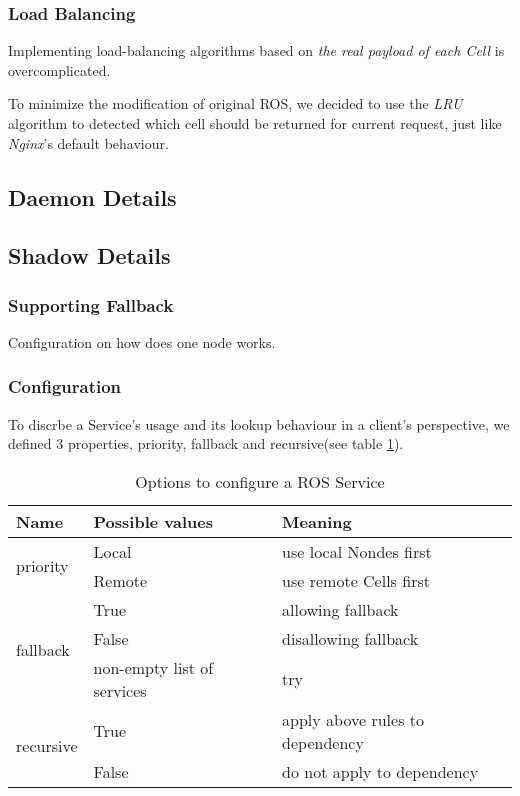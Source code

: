\subsubsection{Load Balancing}
Implementing load-balancing algorithms based on \emph{the real payload of each Cell} is overcomplicated.

To minimize the modification of original ROS, we decided to use the \emph{LRU} algorithm to detected which cell should be returned for current request, just like \emph{Nginx}'s default behaviour.

\subsection{Daemon Details}

\subsection{Shadow Details}
\subsubsection{Supporting Fallback}
Configuration on how does one node works. 

\subsubsection{Configuration}
To discrbe a Service's usage and its lookup behaviour in a client's perspective, we defined 3 properties, priority, fallback and recursive(see table \ref{table:srv-opt}).

\begin{table}
    \renewcommand{\arraystretch}{1.3}
    \caption{Options to configure a ROS Service}
    \label{table:srv-opt}
    \centering
    \begin{tabular}{|l|l|l|}
        \hline
        \bfseries Name & \bfseries Possible values & \bfseries Meaning \\
        \hline
        \multirow{2}{*}{priority}  & Local  & use local Nondes first \\
        \cline{2-3}
                                   & Remote & use remote Cells first \\
        \hline
        \multirow{3}{*}{fallback}  & True   & allowing fallback \\
        \cline{2-3}
                                   & False  & disallowing fallback \\
        \cline{2-3}
                                   & non-empty list of services & try  \\
        \hline
        \multirow{2}{*}{recursive} & True   & apply above rules to dependency \\
        \cline{2-3}
                                   & False  & do not apply to dependency \\
        \hline
    \end{tabular}
\end{table} 

